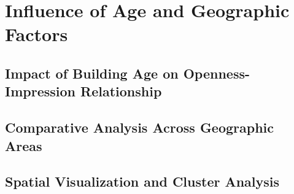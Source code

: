 \chapter{Influence of Age and Geographic Factors}

\section{Impact of Building Age on Openness-Impression Relationship}

\section{Comparative Analysis Across Geographic Areas}

\section{Spatial Visualization and Cluster Analysis}
